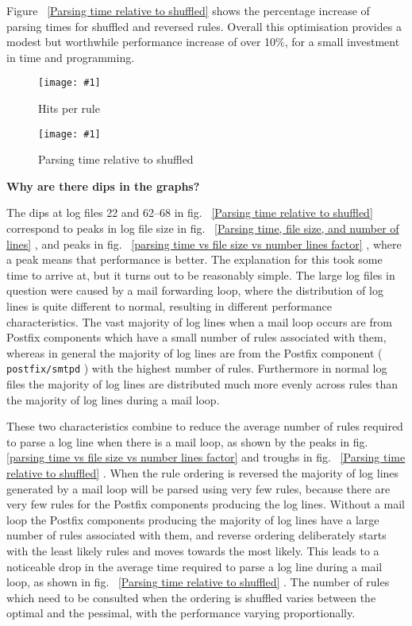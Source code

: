 \documentclass[draft]{svmult}
\newcommand{\showgraph}[3]{%
    \begin{figure}[hbt!]%
        \caption{#2}\label{#3}%
        \texttt{[image: \#1]}%
    \end{figure}%
}
\newcommand{\refwithpage}[1]{%
    \empty{}\vref{#1}%
}
\newcommand{\daemon}[1]{%
    \texttt{postfix/#1}%
}
\begin{document}
Figure~\refwithpage{Parsing time relative to shuffled} shows the percentage
increase of parsing times for shuffled and reversed rules.  Overall this
optimisation provides a modest but worthwhile performance increase of over
10\%, for a small investment in time and programming.
\showgraph{build/plot-hits}{Hits per rule}{rule hits graph} 
\showgraph{build/plot-normal-and-reverse-relative-to-shuffle}{Parsing time
relative to shuffled}{Parsing time relative to shuffled}

\noindent\textbf{Why are there dips in the graphs?}

\label{Why are there dips in the graphs?}

The dips at log files 22 and 62--68 in fig.~\refwithpage{Parsing time
relative to shuffled} correspond to peaks in log file size in
fig.~\refwithpage{Parsing time, file size, and number of lines}, and
peaks in fig.~\refwithpage{parsing time vs file size vs number lines
factor}, where a peak means that performance is better.  The explanation
for this took some time to arrive at, but it turns out to be reasonably
simple.  The large log files in question were caused by a mail forwarding
loop, where the distribution of log lines is quite different to normal,
resulting in different performance characteristics.  The vast majority of
log lines when a mail loop occurs are from Postfix components which have a
small number of rules associated with them, whereas in general the majority
of log lines are from the Postfix component (\daemon{smtpd}) with the
highest number of rules.  Furthermore in normal log files the majority of
log lines are distributed much more evenly across rules than the majority
of log lines during a mail loop.

These two characteristics combine to reduce the average number of rules
required to parse a log line when there is a mail loop, as shown by the
peaks in fig.~\refwithpage{parsing time vs file size vs number lines
factor} and troughs in fig.~\refwithpage{Parsing time relative to
shuffled}.  When the rule ordering is reversed the majority of log lines
generated by a mail loop will be parsed using very few rules, because there
are very few rules for the Postfix components producing the log lines.
Without a mail loop the Postfix components producing the majority of log
lines have a large number of rules associated with them, and reverse
ordering deliberately starts with the least likely rules and moves towards
the most likely.  This leads to a noticeable drop in the average time
required to parse a log line during a mail loop, as shown in
fig.~\refwithpage{Parsing time relative to shuffled}.  The number of rules
which need to be consulted when the ordering is shuffled varies between the
optimal and the pessimal, with the performance varying proportionally.
\end{document}
